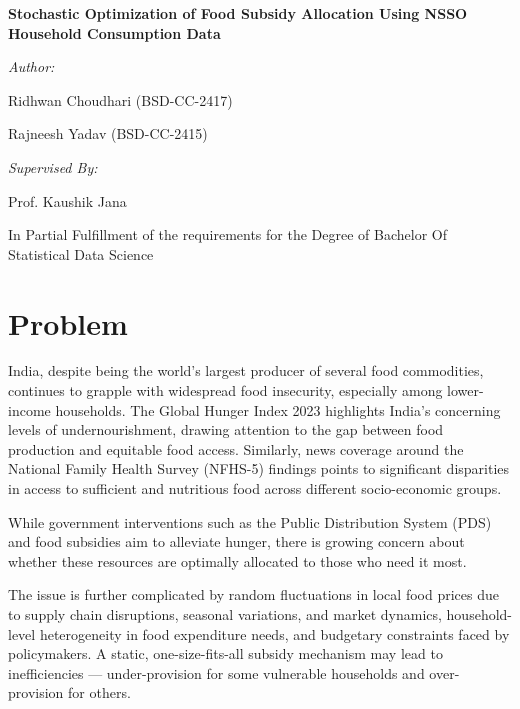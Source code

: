 \documentclass[12pt]{article}
\begin{document}
\clearpage
\begin{titlepage}
    \centering
    \vspace*{2cm}
    {\LARGE\bfseries Stochastic Optimization of Food Subsidy Allocation Using NSSO Household Consumption Data\par}
    \vspace{1.5cm}
    {\large\itshape Author:\par}
    {\large Ridhwan Choudhari (BSD-CC-2417)\par}
    {\large Rajneesh Yadav (BSD-CC-2415)\par}
    {\large\itshape Supervised By:\par}
    {\large Prof. Kaushik Jana\par}
    \vspace{1cm}
    {\large In Partial Fulfillment of the requirements for the Degree of Bachelor Of Statistical Data Science\par}
    \vspace{2cm}
\end{titlepage}


\renewcommand{\cftsecleader}{\cftdotfill{\cftdotsep}}
\tableofcontents

\clearpage
\section{Problem}
India, despite being the world's largest producer of several food commodities, continues to grapple with widespread food insecurity, especially among lower-income households. The Global Hunger Index 2023 highlights India’s concerning levels of undernourishment, drawing attention to the gap between food production and equitable food access. Similarly, news coverage around the National Family Health Survey (NFHS-5) findings points to significant disparities in access to sufficient and nutritious food across different socio-economic groups.

While government interventions such as the Public Distribution System (PDS) and food subsidies aim to alleviate hunger, there is growing concern about whether these resources are optimally allocated to those who need it most.

The issue is further complicated by random fluctuations in local food prices due to supply chain disruptions, seasonal variations, and market dynamics, household-level heterogeneity in food expenditure needs, and budgetary constraints faced by policymakers. A static, one-size-fits-all subsidy mechanism may lead to inefficiencies — under-provision for some vulnerable households and over-provision for others.
\end{document}
